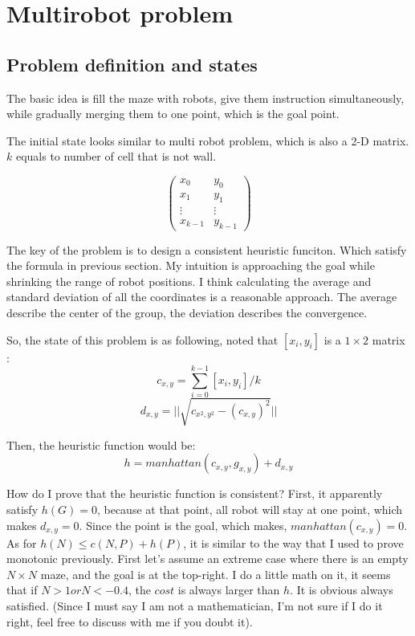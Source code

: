 \clearpage
\section{Multirobot problem}
\subsection{Problem definition and states}

The basic idea is fill the maze with robots, give them instruction simultaneously, while gradually merging them to one point, which is the goal point.

The initial state looks similar to multi robot problem, which is also a 2-D matrix. $k$ equals to number of cell that is not wall.

$$\begin{pmatrix}
x_0 & y_0 \\
x_1 & y_1 \\
\vdots & \vdots \\	
x_{k-1} & y_{k-1}
\end{pmatrix}$$

The key of the problem is to design a consistent heuristic funciton. Which satisfy the formula in previous section. My intuition is approaching the goal while shrinking the range of robot positions. I think calculating the average and standard deviation of all the coordinates is a reasonable approach. The average describe the center of the group, the deviation describes the convergence. 

So, the state of this problem is as following, noted that $[x_i,y_i]$ is a $1\times 2$ matrix :
$$c_{x,y} = \sum^{k-1}_{i=0}[x_i,y_i]/k$$
$$d_{x,y} = ||\sqrt{ c_{x^2,y^2} - (c_{x,y})^2}||$$

Then, the heuristic function would be:
$$h = manhattan(c_{x,y}, g_{x,y}) + d_{x,y}$$

How do I prove that the heuristic function is consistent? First, it apparently satisfy $h(G)=0$, because at that point, all robot will stay at one point, which makes $ d_{x,y} = 0$. Since the point is the goal, which makes, $manhattan(c_{x,y})=0$. As for $h(N) \leq c(N,P)+h(P) $, it is similar to the way that I used to prove monotonic previously. First let's assume an extreme case where there is an empty $N \times N$ maze, and the goal is at the top-right. I do a little math on it, it seems that if $N > 1 or N < -0.4$, the $cost$ is always larger than $h$. It is obvious always satisfied. (Since I must say I am not a mathematician, I'm not sure if I do it right, feel free to discuss with me if you doubt it).


